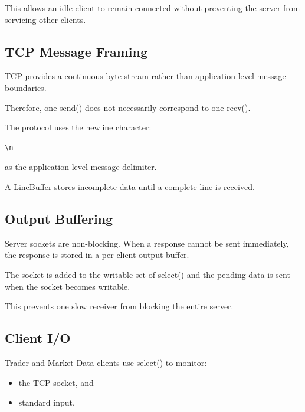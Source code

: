 \documentclass[11pt,a4paper]{article}
\begin{document}
This allows an idle client to remain connected without preventing the server
from servicing other clients.


\subsection{TCP Message Framing}

TCP provides a continuous byte stream rather than application-level message
boundaries.

Therefore, one {send()} does not necessarily correspond to one
{recv()}.

The protocol uses the newline character:

\begin{verbatim}
\n
\end{verbatim}

as the application-level message delimiter.

A {LineBuffer} stores incomplete data until a complete line is
received.


\subsection{Output Buffering}

Server sockets are non-blocking. When a response cannot be sent immediately,
the response is stored in a per-client output buffer.

The socket is added to the writable set of {select()} and the pending
data is sent when the socket becomes writable.

This prevents one slow receiver from blocking the entire server.


\subsection{Client I/O}

Trader and Market-Data clients use {select()} to monitor:

\begin{itemize}
    \item the TCP socket, and
    \item standard input.
\end{itemize}
\end{document}
